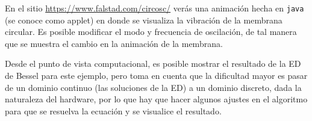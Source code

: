 En el sitio \url{https://www.falstad.com/circosc/} verás una animación hecha en \texttt{java} (se conoce como applet) en donde se visualiza la vibración de la membrana circular. Es posible modificar el modo y frecuencia de oscilación, de tal manera que se muestra el cambio en la animación de la membrana.
\par
Desde el punto de vista computacional, es posible mostrar el resultado de la ED de Bessel para este ejemplo, pero toma en cuenta que la dificultad mayor es pasar de un dominio continuo (las soluciones de la ED) a un dominio discreto, dada la naturaleza del hardware, por lo que hay que hacer algunos ajustes en el algoritmo para que se resuelva la ecuación y se visualice el resultado.
